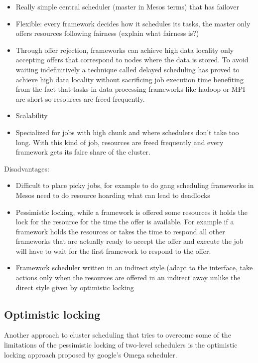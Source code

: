 \documentclass{svjour3}                     %
\begin{document}
\begin{itemize}
  \item
  Really simple central scheduler (master in Mesos terms) that has
  failover 
 \item
  Flexible: every framework decides how it schedules its tasks, the
  master only offers resources following fairness (explain what fairness is?)
 \item
  Through offer rejection, frameworks can achieve high data locality
  only accepting offers that correspond to nodes where the data is
  stored. To avoid waiting indefinitively a technique called delayed
  scheduling \cite{zaharia_delay_2010} has proved to achieve high data locality without
  sacrificing job execution time benefiting from the fact that tasks in
  data processing frameworks like hadoop or MPI are short so resources
  are freed frequently.
 \item Scalability
 \item Specialized for jobs with high chunk and where schedulers don't take
too long. With this kind of job, resources are freed frequently and
every framework gets its faire share of the cluster.
\end{itemize}

Disadvantages:

\begin{itemize}
 \item Difficult to place picky jobs, for example to do gang scheduling
frameworks in Mesos need to do resource hoarding what can lead to
deadlocks
 \item Pessimistic locking, while a framework is offered some resources it
holds the lock for the resource for the time the offer is
available. For example if a framework holds the resources or takes the
time to respond all other frameworks that are actually ready to accept
the offer and execute the job will have to wait for the first
framework to respond to the offer.
 \item Framework scheduler written in an indirect style (adapt to the interface, 
  take actions only when the resources are offered in an indirect away unlike
  the direct style given by optimistic locking
\end{itemize}

\subsection{Optimistic locking}

Another approach to cluster scheduling that tries to overcome some of
the limitations of the pessimistic locking of two-level schedulers is
the optimistic locking approach proposed by google's Omega
scheduler.
\end{document}
